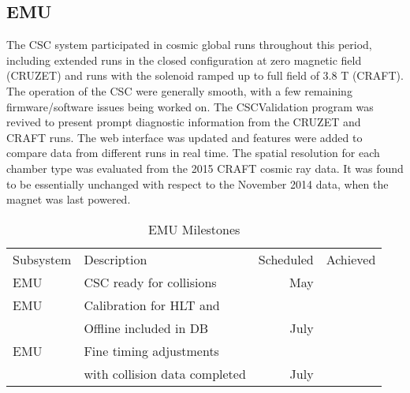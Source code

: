 \subsection{EMU}
The CSC system participated in cosmic global runs throughout
this period, including extended runs in the closed
configuration at zero magnetic field (CRUZET) and runs with
the solenoid ramped up to full field of 3.8 T (CRAFT). The
operation of the CSC were generally smooth, with a few
remaining firmware/software issues being worked on.
The CSCValidation program was revived to present prompt
diagnostic information from the CRUZET and CRAFT runs. The web
interface was updated and features were added to compare data
from different runs in real time.
The spatial resolution for each chamber type was evaluated from the
2015 CRAFT cosmic ray data. It was found to be essentially unchanged
with respect to the November 2014 data, when the magnet was last powered.
\begin{table}[htp]
\caption{EMU Milestones}
\begin{center}
\begin{tabular}{|l|l|r|r|}
\hline
Subsystem&Description&Scheduled&Achieved\\
EMU& CSC ready for collisions& May & \\
\hline
EMU& Calibration for HLT and & &\\
& Offline included in DB & July & \\
\hline
EMU & Fine timing adjustments & & \\
&with collision data completed & July & \\
\hline
\end{tabular}
\end{center}
\label{EMUMilestones}
\end{table}


